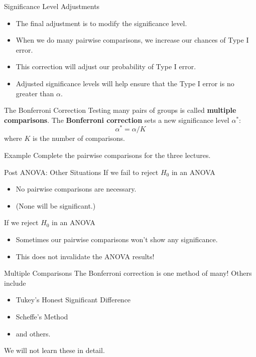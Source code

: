 \begin{frame}{Significance Level Adjustments}
    \begin{itemize}
        \item The final adjustment is to modify the significance level.
        \item When we do many pairwise comparisons, we increase our chances of Type I error.
        \item This correction will adjust our probability of Type I error.
        \item Adjusted significance levels will help ensure that the Type I error is no greater than $\alpha$.
    \end{itemize}
\end{frame}

\begin{frame}{The Bonferroni Correction}
    Testing many pairs of groups is called \textbf{multiple comparisons}. The \textbf{Bonferroni correction} sets a new significance level $\alpha^*$:
    \[
        \alpha^* = \alpha/K
    \]
    where $K$ is the number of comparisons. 
\end{frame}

\begin{frame}{Example}
    Complete the pairwise comparisons for the three lectures.
\end{frame}

\begin{frame}{Post ANOVA: Other Situations}
    If we fail to reject $H_0$ in an ANOVA
    \begin{itemize}
        \item No pairwise comparisons are necessary.
        \item (None will be significant.)
    \end{itemize}
    
    \vspace{12pt}If we reject $H_0$ in an ANOVA
    \begin{itemize}
        \item Sometimes our pairwise comparisons won't show any significance.
        \item This does not invalidate the ANOVA results!
    \end{itemize}
\end{frame}

\begin{frame}{Multiple Comparisons}
    The Bonferroni correction is one method of many! Others include
    \begin{itemize}
        \item Tukey's Honest Significant Difference
        \item Scheffe's Method
        \item and others.
    \end{itemize}{}
    We will not learn these in detail.
\end{frame}
